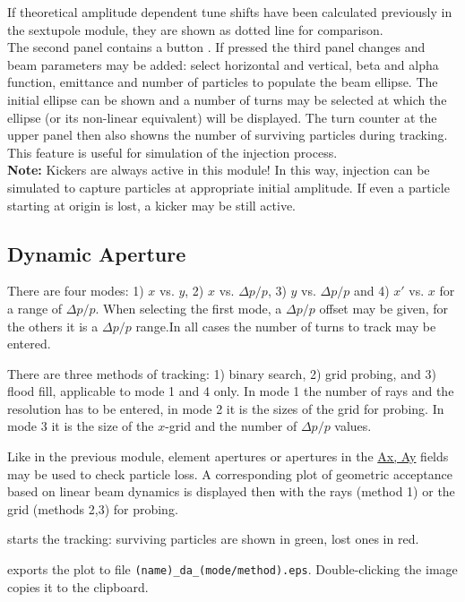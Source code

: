 \documentclass[12pt]{article}
\newcommand\button[1]{\fbox{\small\bf #1}}
\newcommand\field[1]{\underline{\small #1}}
\begin{document}
If theoretical amplitude dependent tune shifts have been calculated previously in the
sextupole module, they are shown as dotted line for comparison.\\

The second panel contains a button \button{Beam}. If pressed the  third panel changes and beam parameters may be added: select horizontal and vertical, beta and alpha function, emittance and number of particles to populate the beam ellipse. The initial ellipse can be shown and a number of turns may be selected at which the ellipse (or its non-linear equivalent) will be displayed. The turn counter at the upper panel then also showns the number of surviving particles during tracking. This feature is useful for simulation of the injection process.\\

{\bf Note:} Kickers are always active in this module! In this way, injection can be simulated to capture particles at appropriate initial amplitude. If even a particle starting at origin is lost, a kicker may be still active.


\subsection{\label{ssectda}Dynamic Aperture}
There are four modes: 1) $x$ vs. $y$, 2) $x$ vs. $\Delta p/p$, 3) $y$ vs. $\Delta p/p$ and 4) $x'$ vs. $x$ for a range of  $\Delta p/p$.
When selecting the first mode, a $\Delta p/p$ offset may be given, for
the others it is a $\Delta p/p$ range.In all cases the number of turns to track may be entered.

There are three methods of tracking: 1) binary search, 2) grid probing, and 3) flood fill, applicable to mode 1 and 4 only. In mode 1 the number of rays and the resolution has to be entered, in mode 2 it is the sizes of the grid for probing. In mode 3 it is the size of the $x$-grid and the number of $\Delta p/p$ values.

Like in the previous module, element apertures or apertures in the \field{Ax, Ay} fields may be used to check particle loss. A corresponding plot of geometric acceptance based on linear beam dynamics is displayed then with the rays (method 1) or the grid (methods 2,3) for probing.

\button{Start} starts the tracking: surviving particles are shown in green, lost ones in red.

\button{EPS} exports the plot to file {\tt (name)\_da\_(mode/method).eps}.
Double-clicking the image copies it to the clipboard.
\end{document}
